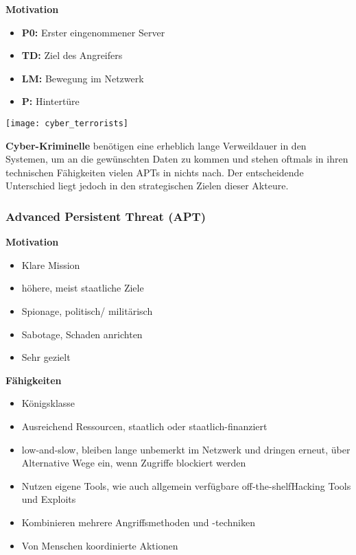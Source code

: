 \begin{minipage}{0.5\linewidth}
    \textbf{Motivation}
    \begin{itemize}
        \item \textbf{P0:} Erster eingenommener Server
        \item \textbf{TD:} Ziel des Angreifers
        \item \textbf{LM:} Bewegung im Netzwerk
        \item \textbf{P:} Hintertüre
    \end{itemize}
\end{minipage}
\begin{minipage}{0.5\linewidth}
    \texttt{[image: cyber\_terrorists]}\\
\end{minipage}

\textbf{Cyber-Kriminelle} benötigen eine erheblich lange Verweildauer in den Systemen, um an die gewünschten Daten zu kommen und stehen oftmals in ihren technischen Fähigkeiten vielen APTs in nichts nach. Der entscheidende
Unterschied liegt jedoch in den strategischen Zielen dieser Akteure.

\newpage

\subsubsection{Advanced Persistent Threat (APT)}
\begin{minipage}{0.5\linewidth}
    \textbf{Motivation}
    \begin{itemize}
        \item Klare Mission
        \item höhere, meist staatliche Ziele
        \item Spionage, politisch/ militärisch
        \item Sabotage, Schaden anrichten
        \item Sehr gezielt
    \end{itemize}
\end{minipage}
\begin{minipage}{0.45\linewidth}
    \textbf{Fähigkeiten}\\
    \begin{itemize}
        \item Königsklasse
        \item Ausreichend Ressourcen, staatlich oder staatlich-finanziert
        \item \glqq low-and-slow\grqq, bleiben lange unbemerkt im Netzwerk und dringen erneut, über Alternative Wege ein, wenn Zugriffe blockiert werden
        \item Nutzen eigene Tools, wie auch allgemein verfügbare \glqq off-the-shelf\grqq Hacking Tools und Exploits
        \item Kombinieren mehrere Angriffsmethoden und -techniken
        \item Von Menschen koordinierte Aktionen\\
    \end{itemize}
\end{minipage}


